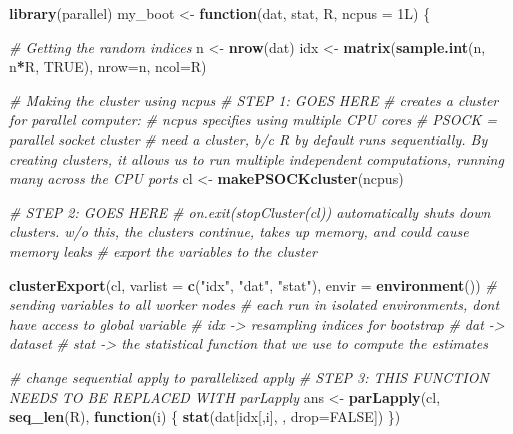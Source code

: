 \documentclass[
]{article}
\newenvironment{Shaded}{\begin{snugshade}}{\end{snugshade}}
\newcommand{\AttributeTok}[1]{\textcolor[rgb]{0.13,0.29,0.53}{#1}}
\newcommand{\CommentTok}[1]{\textcolor[rgb]{0.56,0.35,0.01}{\textit{#1}}}
\newcommand{\ConstantTok}[1]{\textcolor[rgb]{0.56,0.35,0.01}{#1}}
\newcommand{\ControlFlowTok}[1]{\textcolor[rgb]{0.13,0.29,0.53}{\textbf{#1}}}
\newcommand{\DataTypeTok}[1]{\textcolor[rgb]{0.13,0.29,0.53}{#1}}
\newcommand{\DecValTok}[1]{\textcolor[rgb]{0.00,0.00,0.81}{#1}}
\newcommand{\FunctionTok}[1]{\textcolor[rgb]{0.13,0.29,0.53}{\textbf{#1}}}
\newcommand{\NormalTok}[1]{#1}
\newcommand{\OtherTok}[1]{\textcolor[rgb]{0.56,0.35,0.01}{#1}}
\newcommand{\SpecialCharTok}[1]{\textcolor[rgb]{0.81,0.36,0.00}{\textbf{#1}}}
\newcommand{\StringTok}[1]{\textcolor[rgb]{0.31,0.60,0.02}{#1}}
\begin{document}
\begin{Shaded}
\begin{Highlighting}[]
\FunctionTok{library}\NormalTok{(parallel)}
\NormalTok{my\_boot }\OtherTok{\textless{}{-}} \ControlFlowTok{function}\NormalTok{(dat, stat, R, }\AttributeTok{ncpus =} \DecValTok{1}\DataTypeTok{L}\NormalTok{) \{}
  
  \CommentTok{\# Getting the random indices}
\NormalTok{  n }\OtherTok{\textless{}{-}} \FunctionTok{nrow}\NormalTok{(dat)}
\NormalTok{  idx }\OtherTok{\textless{}{-}} \FunctionTok{matrix}\NormalTok{(}\FunctionTok{sample.int}\NormalTok{(n, n}\SpecialCharTok{*}\NormalTok{R, }\ConstantTok{TRUE}\NormalTok{), }\AttributeTok{nrow=}\NormalTok{n, }\AttributeTok{ncol=}\NormalTok{R)}
 
  \CommentTok{\# Making the cluster using \textasciigrave{}ncpus\textasciigrave{}}
  \CommentTok{\# STEP 1: GOES HERE}
  \CommentTok{\# creates a cluster for parallel computer: }
  \CommentTok{\# ncpus specifies using multiple CPU cores }
  \CommentTok{\# PSOCK = parallel socket cluster }
  \CommentTok{\# need a cluster, b/c R by default runs sequentially. By creating clusters, it allows us     to run multiple independent computations, running many across the CPU ports }
\NormalTok{  cl }\OtherTok{\textless{}{-}} \FunctionTok{makePSOCKcluster}\NormalTok{(ncpus)}
  
  \CommentTok{\# STEP 2: GOES HERE}
  \CommentTok{\# on.exit(stopCluster(cl)) automatically shuts down clusters. w/o this, the clusters        continue, takes up memory, and could cause memory leaks }
  \CommentTok{\# export the variables to the cluster }
  
  \FunctionTok{clusterExport}\NormalTok{(cl, }\AttributeTok{varlist =} \FunctionTok{c}\NormalTok{(}\StringTok{"idx"}\NormalTok{, }\StringTok{"dat"}\NormalTok{, }\StringTok{"stat"}\NormalTok{), }\AttributeTok{envir =} \FunctionTok{environment}\NormalTok{()) }
    \CommentTok{\# sending variables to all worker nodes}
    \CommentTok{\# each run in isolated environments, don\textquotesingle{}t have access to global variable }
    \CommentTok{\# idx {-}\textgreater{} resampling indices for bootstrap }
    \CommentTok{\# dat {-}\textgreater{} dataset }
    \CommentTok{\# stat {-}\textgreater{} the statistical function that we use to compute the estimates }
  
  
  \CommentTok{\# change sequential apply to parallelized apply}
  \CommentTok{\# STEP 3: THIS FUNCTION NEEDS TO BE REPLACED WITH parLapply}
\NormalTok{  ans }\OtherTok{\textless{}{-}} \FunctionTok{parLapply}\NormalTok{(cl, }\FunctionTok{seq\_len}\NormalTok{(R), }\ControlFlowTok{function}\NormalTok{(i) \{}
    \FunctionTok{stat}\NormalTok{(dat[idx[,i], , }\AttributeTok{drop=}\ConstantTok{FALSE}\NormalTok{])}
\NormalTok{  \})}
  

\end{Highlighting}
\end{Shaded}
\end{document}
